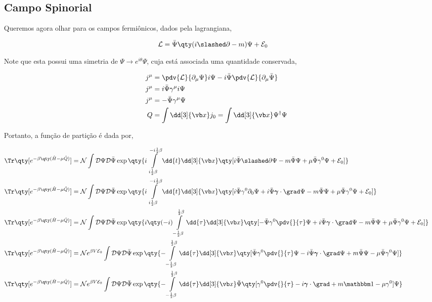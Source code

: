 \documentclass[twoside]{amsart}
\numberwithin{equation}{section}
\newcommand{\Dd}[1]{\mathcal D #1}
\begin{document}
\begin{refsection}
\section{Campo Spinorial}

Queremos agora olhar para os campos fermiônicos, dados pela lagrangiana,

\begin{align}
    \mathcal L&=\bar\Psi\qty(i\slashed \partial-m)\Psi+\mathcal E_0
\end{align}

Note que esta possui uma simetria de $\Psi\rightarrow e^{i\theta}\Psi$, cuja está associada uma quantidade conservada,

\begin{align}
    j^\mu&=\pdv{\mathcal L}{\partial_\mu\Psi}i\Psi-i\bar\Psi\pdv{\mathcal L}{\partial_\mu\bar\Psi}\\
    j^\mu&=i\bar\Psi\gamma^\mu i\Psi\\
    j^\mu&=-\bar\Psi\gamma^\mu\Psi\\
    Q&=\int\dd[3]{\vb x}j_0=\int\dd[3]{\vb x}\Psi^\dagger\Psi
\end{align}

Portanto, a função de partição é dada por,

\begin{align}
    \Tr\qty[e^{-\beta\qty(\hat H-\mu\hat Q)}]&=\mathcal N\int\Dd{\Psi}\Dd{\bar\Psi}\exp\qty{i\int\limits_{i\frac12\beta}^{-i\frac12\beta}\dd{t}\dd[3]{\vb x}\qty[i\bar\Psi\slashed \partial\Psi-m\bar\Psi\Psi+\mu\bar\Psi\gamma^0\Psi+\mathcal E_0]}\\
    \Tr\qty[e^{-\beta\qty(\hat H-\mu\hat Q)}]&=\mathcal N\int\Dd{\Psi}\Dd{\bar\Psi}\exp\qty{i\int\limits_{i\frac12\beta}^{-i\frac12\beta}\dd{t}\dd[3]{\vb x}\qty[i\bar\Psi\gamma^0 \partial_0\Psi+i\bar\Psi\boldsymbol{\gamma}\cdot \grad\Psi-m\bar\Psi\Psi+\mu\bar\Psi\gamma^0\Psi+\mathcal E_0]}\\
    \Tr\qty[e^{-\beta\qty(\hat H-\mu\hat Q)}]&=\mathcal N\int\Dd{\Psi}\Dd{\bar\Psi}\exp\qty{i\qty(-i)\int\limits_{-\frac12\beta}^{\frac12\beta}\dd{\tau}\dd[3]{\vb x}\qty[-\bar\Psi\gamma^0 \pdv{}{\tau}\Psi+i\bar\Psi\boldsymbol{\gamma}\cdot \grad\Psi-m\bar\Psi\Psi+\mu\bar\Psi\gamma^0\Psi+\mathcal E_0]}\\
    \Tr\qty[e^{-\beta\qty(\hat H-\mu\hat Q)}]&=\mathcal Ne^{\beta V\mathcal E_0}\int\Dd{\Psi}\Dd{\bar\Psi}\exp\qty{-\int\limits_{-\frac12\beta}^{\frac12\beta}\dd{\tau}\dd[3]{\vb x}\qty[\bar\Psi\gamma^0 \pdv{}{\tau}\Psi-i\bar\Psi\boldsymbol{\gamma}\cdot \grad\Psi+m\bar\Psi\Psi-\mu\bar\Psi\gamma^0\Psi]}\\
    \Tr\qty[e^{-\beta\qty(\hat H-\mu\hat Q)}]&=\mathcal Ne^{\beta V\mathcal E_0}\int\Dd{\Psi}\Dd{\bar\Psi}\exp\qty{-\int\limits_{-\frac12\beta}^{\frac12\beta}\dd{\tau}\dd[3]{\vb x}\bar\Psi\qty[\gamma^0 \pdv{}{\tau}-i\boldsymbol{\gamma}\cdot \grad+m\mathbbm 1-\mu\gamma^0]\Psi}
\end{align}


\end{refsection}
\end{document}
